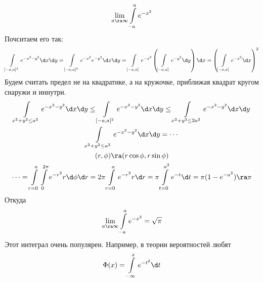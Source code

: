 \begin{exmp}
	\[
		\lim_{a \ra \infty} \int\limits_{-a}^{a} e^{-x^2}
	\]
	Почситаем его так:
	\begin{gather*}
		\int\limits_{[-a,a]^2} e^{-x^2-y^2} \d x \d y = \int\limits_{[-a,a]^2} e^{-x^2} e^{-y^2} \d x \d y
		= \int\limits_{[-a,a]} e^{-x^2} \left(\int\limits_{[-a,a]} e^{-y^2} \d y \right)\d x
		= \left(\int\limits_{[-a,a]} e^{-x^2} \d x\right)^2
	\end{gather*}
	Будем считать предел не на квадратике, а на кружочке, приближая квадрат кругом снаружи и иннутри.
	\begin{gather*}
		\int\limits_{x^2+y^2\le a^2} e^{-x^2-y^2} \d x \d y
		\le \int\limits_{[-a,a]^2} e^{-x^2-y^2} \d x \d y
		\le \int\limits_{x^2+y^2\le2a^2} e^{-x^2-y^2} \d x \d y \\
		\int\limits_{x^2+y^2 \le a^2} e^{-x^2-y^2} \d x \d y = \cdots \\
		(r, \phi) \ra (r \cos \phi, r \sin \phi) \\
		\cdots = \int\limits_{r=0}^a \int\limits_{0}^{2\pi} e^{-r^2} r \d \phi \d r
		= 2 \pi \int\limits_{r=0}^a e^{-r^2} r \d r = \pi \int\limits_{t=0}^{a^2} e^{-t} \d t = \pi (1-e^{-a^2}) \ra \pi
	\end{gather*}
	Откуда
	\[
		\lim_{a \ra \infty} \int\limits_{-a}^{a} e^{-x^2} = \sqrt \pi
	\]
	Этот интеграл очень популярен.
	Например, в теории вероятностей любят
	\[ \Phi(x) = \int\limits_{-\infty}^x e^{-t^2} \d t \]
\end{exmp}

